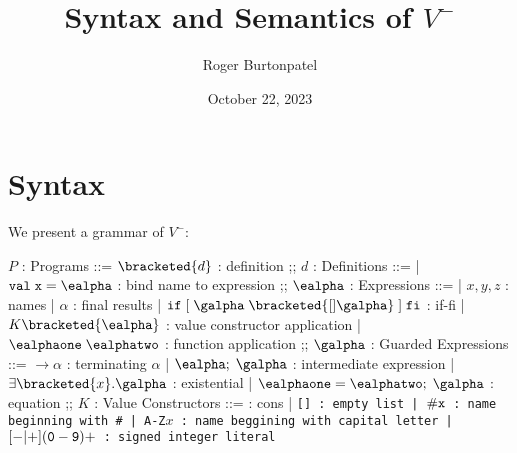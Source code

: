 \documentclass[]{article}
\title{Syntax and Semantics of $V^{-}$}
\author{Roger Burtonpatel}
\date{October 22, 2023}
\begin{document}
\maketitle

\section{Syntax}

We present a grammar of $V^{-}$: 

\bigskip



\begin{center}
    \begin{bnf}
    $P$ : \textsf{Programs} ::=
    $\bracketed{d}$ : definition
    ;;
    $d$ : \textsf{Definitions} ::=
    | $\tt{val} \; x \; \tt{=} \; \ealpha$ : bind name to expression
    ;;
    $\ealpha$ : \textsf{Expressions} ::=
    | $x, y, z$ : names
    | $\alpha$ : final results
    | $\tt{if} \; \tt{[}\; \galpha \; \bracketed{[] \galpha} \;\tt{]} \; \tt{fi}$ : if-fi 
    | $K \bracketed{\ealpha}$ : value constructor application 
    | $\ealphaone \; \ealphatwo$ : function application 
    ;;
    $\galpha$ : \textsf{Guarded Expressions} ::=  
    $\boldsymbol{\rightarrow}\alpha$ : terminating $\alpha$ 
    | $\ealpha; \; \galpha$ : intermediate expression 
    | $\exists \bracketed{x} \tt{.} \galpha$ : existential 
    | $\ealphaone = \ealphatwo; \; \galpha$ : equation 
    ;;
    $K$ : \textsf{Value Constructors} ::=
    \cons : cons 
    | \tt{[]} : empty list 
    | $\tt{\#}x$ : name beginning with \tt{\#}
    | \tt{A-Z}$x$ : name beggining with capital letter
    | $[\tt{-}\vert\tt{+}](\tt{0}-\tt{9})+$ : signed integer literal 

    \end{bnf}
\end{center}
\end{document}
